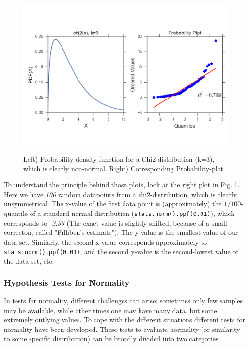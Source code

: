 \begin{figure}
  \centering
  \includegraphics[width=1.0\textwidth]{../Images/chi2pp.png}\\
  \caption{Left) Probability-density-function for a Chi2-distribution (k=3), which is clearly non-normal. Right) Corresponding Probability-plot}\label{fig:qqplotChi2}
\end{figure}

To understand the principle behind those plots, look at the right plot in Fig. \ref{fig:qqplotChi2}. Here we have \emph{100} random datapoints from a chi2-distribution, which is clearly unsymmetrical. The x-value of the first data point is (approximately) the $1/100$-quantile of a standard normal distribution (\lstinline{stats.norm().ppf(0.01)}), which corresponds to \emph{-2.33} (The exact value is slightly shifted, because of a small correcton, called "Filliben's estimate"). The y-value is the smallest value of our data-set. Similarly, the second x-value corresponds approximately to \lstinline{stats.norm().ppf(0.01)}, and the second y-value is the second-lowest value of the data set, etc.

\subsubsection{Hypothesis Tests for Normality}

In tests for normality, different challenges can arise: sometimes only few samples may be available, while other times one may have many data, but some extremely outlying values. To cope with the different situations different tests for normality have been developed. These tests to evaluate normality (or similarity to some specific distribution) can be broadly divided into two categories:

